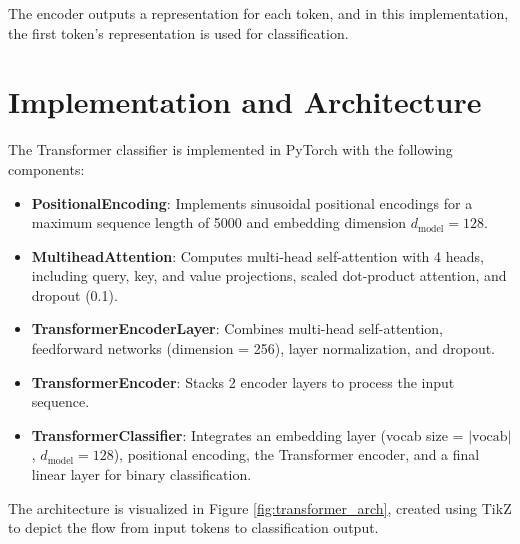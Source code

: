 \documentclass{article}
\begin{document}
The encoder outputs a representation for each token, and in this implementation, the first token's representation is used for classification.

\section{Implementation and Architecture}
The Transformer classifier is implemented in PyTorch with the following components:

\begin{itemize}
    \item \textbf{PositionalEncoding}: Implements sinusoidal positional encodings for a maximum sequence length of 5000 and embedding dimension \( d_{\text{model}} = 128 \).
    \item \textbf{MultiheadAttention}: Computes multi-head self-attention with 4 heads, including query, key, and value projections, scaled dot-product attention, and dropout (0.1).
    \item \textbf{TransformerEncoderLayer}: Combines multi-head self-attention, feedforward networks (dimension = 256), layer normalization, and dropout.
    \item \textbf{TransformerEncoder}: Stacks 2 encoder layers to process the input sequence.
    \item \textbf{TransformerClassifier}: Integrates an embedding layer (vocab size = \( |\text{vocab}| \), \( d_{\text{model}} = 128 \)), positional encoding, the Transformer encoder, and a final linear layer for binary classification.
\end{itemize}

The architecture is visualized in Figure \ref{fig:transformer_arch}, created using TikZ to depict the flow from input tokens to classification output.
\end{document}
